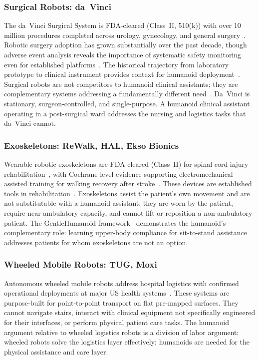 \subsubsection{Surgical Robots: da~Vinci}

The da~Vinci Surgical System is FDA-cleared (Class~II, 510(k)) with over 10
million procedures completed across urology, gynecology, and general
surgery~\cite{lanfranco2004robotic,sheetz2020robotic}. Robotic surgery adoption
has grown substantially over the past decade, though adverse event analysis
reveals the importance of systematic safety monitoring even for established
platforms~\cite{alemzadeh2016adverse}. The historical trajectory from laboratory
prototype to clinical instrument provides context for humanoid
deployment~\cite{camarillo2004robotic}. Surgical robots are not competitors to
humanoid clinical assistants; they are complementary systems addressing a
fundamentally different need~\cite{morgan2022robots}. Da~Vinci is stationary, surgeon-controlled, and single-purpose.
A humanoid clinical assistant operating in a post-surgical ward addresses the
nursing and logistics tasks that da~Vinci cannot.

\subsubsection{Exoskeletons: ReWalk, HAL, Ekso Bionics}

Wearable robotic exoskeletons are FDA-cleared (Class~II) for spinal cord injury
rehabilitation~\cite{esquenazi2012rewalk}, with Cochrane-level evidence supporting
electromechanical-assisted training for walking recovery after
stroke~\cite{mehrholz2017electromechanical}.
These devices are established tools in rehabilitation~\cite{sorensen2025humanoid}. Exoskeletons assist the patient's own
movement and are not substitutable with a humanoid assistant: they are worn by
the patient, require near-ambulatory capacity, and cannot lift or reposition a
non-ambulatory patient. The GentleHumanoid framework~\cite{lu2025gentlehumanoid}
demonstrates the humanoid's complementary role: learning upper-body compliance
for sit-to-stand assistance addresses patients for whom exoskeletons are not an
option.

\subsubsection{Wheeled Mobile Robots: TUG, Moxi}

Autonomous wheeled mobile robots address hospital logistics with confirmed
operational deployments at major US health systems~\cite{huang2023intelligent,morgan2022robots}.
These systems are purpose-built for point-to-point transport on flat pre-mapped
surfaces. They cannot navigate stairs, interact with clinical equipment not
specifically engineered for their interfaces, or perform physical patient care
tasks. The humanoid argument relative to wheeled logistics robots is a division
of labor argument: wheeled robots solve the logistics layer effectively;
humanoids are needed for the physical assistance and care layer.

